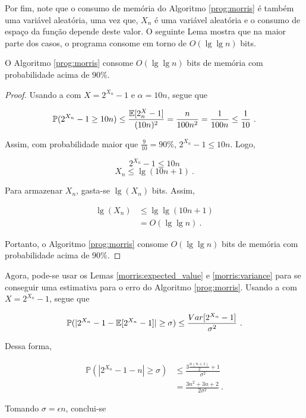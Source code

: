 Por fim, note que o consumo de memória do Algoritmo \ref{prog:morris} é também uma variável aleatória, uma vez que,
$X_n$ é uma variável aleatória e o consumo de espaço da função depende deste valor. O seguinte Lema mostra que na maior 
parte dos casos, o programa consome em torno de $O(\lg\lg n)$ bits.


\begin{lemma}
  O Algoritmo \ref{prog:morris} consome $O(\lg \lg n)$ bits de memória com probabilidade acima de $90\%$.
\end{lemma}

\begin{proof}
  Usando a  com $X = 2^{X_n} - 1$ e $\alpha = 10n$, segue que

\[ \mathbb{P}(2^{X_n} - 1 \geq 10n)  \leq \frac{\mathbb{E}[2^X_n - 1]}{(10n)^2} = \frac{n}{100n^2} = \frac{1}{100n} \leq \frac{1}{10} \ . \]

Assim, com probabilidade maior que $\frac{9}{10} = 90\%$, $2^{X_n} - 1 \leq 10n$. Logo, 

\[ 2^{X_n} - 1 \leq 10n  \]
\[ X_n \leq \lg(10n + 1) \ .\]

Para armazenar $X_n$, gasta-se $\lg(X_n)$ bits. Assim,

\begin{align*}
  \lg(X_n) 
    &\leq \lg\lg(10n + 1) \\ 
    &= O(\lg \lg n) \ .
\end{align*} 

Portanto, o Algoritmo \ref{prog:morris} consome $O(\lg \lg n)$ bits de memória com probabilidade acima de $90\%$.

\end{proof}

Agora, pode-se usar os Lemas \ref{morris:expected_value} e \ref{morris:variance} para se conseguir uma estimativa para o 
erro do Algoritmo \ref{prog:morris}.
Usando a  com $X = 2^{X_n} - 1$, segue que

\[ \mathbb{P}(|2^{X_n} - 1 - \Ebb[2^{X_n} - 1]| \geq \sigma ) \leq \frac{Var[2^{X_n} - 1]}{\sigma^2} \ . \]

Dessa forma, 

\begin{align*}
  \mathbb{P}(|2^{X_n} - 1 - n| \geq \sigma ) 
    &\leq \frac{3\frac{n(n+1)}{2} + 1}{\sigma^2}  \\
    &= \frac{3n^2 + 3n + 2}{2\sigma^2} \ .
\end{align*}


Tomando $\sigma = \epsilon n$, conclui-se

